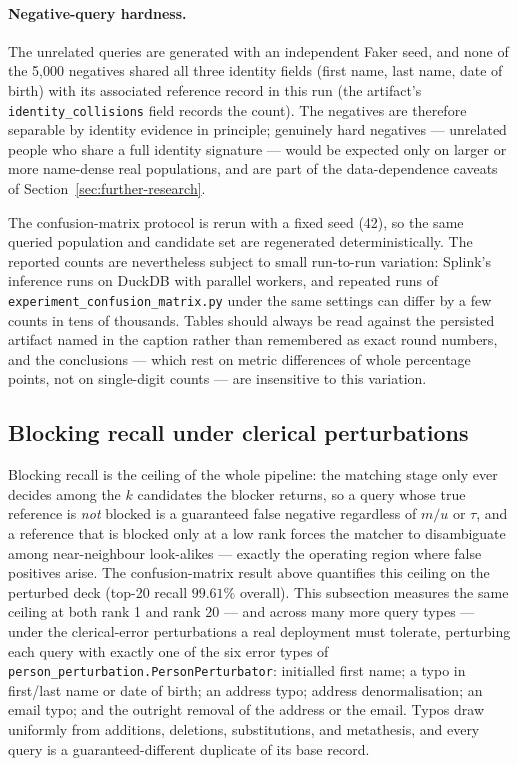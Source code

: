 \documentclass[11pt]{article}
\begin{document}
\paragraph{Negative-query hardness.} The unrelated queries are generated with an independent Faker seed, and none of the 5,000 negatives shared all three identity fields (first name, last name, date of birth) with its associated reference record in this run (the artifact's \texttt{identity\_collisions} field records the count). The negatives are therefore separable by identity evidence in principle; genuinely hard negatives --- unrelated people who share a full identity signature --- would be expected only on larger or more name-dense real populations, and are part of the data-dependence caveats of Section~\ref{sec:further-research}.

The confusion-matrix protocol is rerun with a fixed seed (42), so the same queried population and candidate set are regenerated deterministically. The reported counts are nevertheless subject to small run-to-run variation: Splink's inference runs on DuckDB with parallel workers, and repeated runs of \texttt{experiment\_confusion\_matrix.py} under the same settings can differ by a few counts in tens of thousands. Tables should always be read against the persisted artifact named in the caption rather than remembered as exact round numbers, and the conclusions --- which rest on metric differences of whole percentage points, not on single-digit counts --- are insensitive to this variation.

\subsection{Blocking recall under clerical perturbations}
\label{sec:blocking-recall-perturbed}
Blocking recall is the ceiling of the whole pipeline: the matching stage only ever decides among the $k$ candidates the blocker returns, so a query whose true reference is \emph{not} blocked is a guaranteed false negative regardless of $m/u$ or $\tau$, and a reference that is blocked only at a low rank forces the matcher to disambiguate among near-neighbour look-alikes --- exactly the operating region where false positives arise. The confusion-matrix result above quantifies this ceiling on the perturbed deck (top-20 recall $99.61\%$ overall). This subsection measures the same ceiling at both rank 1 and rank 20 --- and across many more query types --- under the clerical-error perturbations a real deployment must tolerate, perturbing each query with exactly one of the six error types of \texttt{person\_perturbation.PersonPerturbator}: initialled first name; a typo in first/last name or date of birth; an address typo; address denormalisation; an email typo; and the outright removal of the address or the email. Typos draw uniformly from additions, deletions, substitutions, and metathesis, and every query is a guaranteed-different duplicate of its base record.
\end{document}
